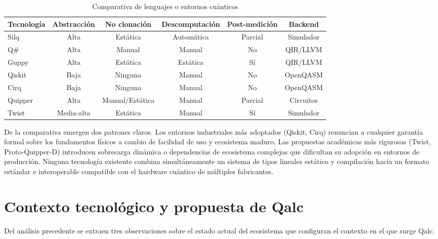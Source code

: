 \begin{table}[!ht]
\centering
\caption{Comparativa de lenguajes o entornos cuánticos}
\label{tab:comparativa}
\small
\begin{tabularx}{\textwidth}{lCCCCC}
\toprule
\textbf{Tecnología} & \textbf{Abstracción} & \textbf{No clonación} & \textbf{Descomputación} & \textbf{Post-medición} & \textbf{Backend} \\
\midrule
Silq & Alta & Estática & Automática & Parcial & Simulador \\
Q\# & Alta & Manual & Manual & No & QIR/LLVM \\
Guppy & Alta & Estática & Estática & Sí & QIR/LLVM \\
Qiskit & Baja & Ninguna & Manual & No & OpenQASM \\
Cirq & Baja & Ninguna & Manual & No & OpenQASM \\
Quipper & Alta & Manual/Estática & Manual & Parcial & Circuitos \\
Twist & Media-alta & Estática & Manual & Sí & Simulador \\
\bottomrule
\end{tabularx}
\end{table}

De la comparativa emergen dos patrones claros. Los entornos industriales más adoptados (Qiskit, Cirq) renuncian a cualquier garantía formal sobre los fundamentos físicos a cambio de facilidad de uso y ecosistema maduro. Las propuestas académicas más rigurosas (Twist, Proto-Quipper-D) introducen sobrecarga dinámica o dependencias de ecosistema complejas que dificultan su adopción en entornos de producción. Ninguna tecnología existente combina simultáneamente un sistema de tipos lineales estático y compilación hacia un formato estándar e interoperable compatible con el hardware cuántico de múltiples fabricantes.

\section{Contexto tecnológico y propuesta de Qalc}
\label{sec:contexto}

Del análisis precedente se extraen tres observaciones sobre el estado actual del ecosistema que configuran el contexto en el que surge Qalc.

